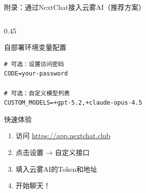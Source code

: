 \documentclass[aspectratio=169,11pt]{beamer}
\begin{document}
\begin{frame}[fragile]{附录：通过NextChat接入云雾AI（推荐方案）}
\begin{columns}
\begin{column}{0.45\textwidth}
\begin{block}{自部署环境变量配置}
\begin{lstlisting}[basicstyle=\ttfamily\tiny]
# 可选：设置访问密码
CODE=your-password

# 可选：自定义模型列表
CUSTOM_MODELS=+gpt-5.2,+claude-opus-4.5
                \end{lstlisting}
            \end{block}
            
            \vspace{0.2cm}
            \begin{exampleblock}{快速体验}
                \small
                \begin{enumerate}
                    \item 访问 \url{https://app.nextchat.club}
                    \item 点击设置 → 自定义接口
                    \item 填入云雾AI的Token和地址
                    \item 开始聊天！
                \end{enumerate}
            \end{exampleblock}
        \end{column}
    \end{columns}
\end{frame}
\end{document}
